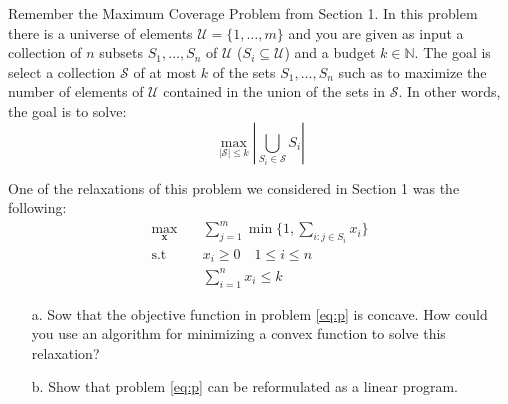 \documentclass[11pt]{article}
\theoremstyle{remark}
\newcommand{\N}{\mathbb{N}}                     %
\newcommand{\bx}{\mathbf{x}}
\begin{document}
Remember the Maximum Coverage Problem from Section 1. In this problem there is
a universe of elements $\mathcal{U} = \{1,\dots,m\}$ and you are given as input
a collection of $n$ subsets $S_1,\dots, S_n$ of $\mathcal{U}$ ($S_i\subseteq
\mathcal{U}$) and a budget $k\in\N$. The goal is select a collection
$\mathcal{S}$ of at most $k$ of the sets $S_1,\dots,S_n$ such as to maximize
the number of elements of $\mathcal{U}$ contained in the union of the sets in
$\mathcal{S}$. In other words, the goal is to solve:
\begin{displaymath}
    \max_{|\mathcal{S}|\leq k}\left|\bigcup_{S_i\in\mathcal{S}} S_i\right|
\end{displaymath}

One of the relaxations of this problem we considered in Section 1 was the
following:
    \begin{equation}
        \tag{P}
        \label{eq:p}
        \begin{aligned}
            \max_{\bx} &\quad \sum_{j=1}^m \min\Bigg\{1,\sum_{i:j\in S_i} x_i\Bigg\}\\
            \text{s.t} &\quad x_i\geq 0\quad 1\leq i\leq n\\
                       &\quad \sum_{i=1}^n x_i\leq k
        \end{aligned}
    \end{equation}

\begin{itemize}
    \item[a.]  Sow that the objective function in problem \eqref{eq:p} is
        concave. How could you use an algorithm for minimizing a convex
        function to solve this relaxation?
    \item[b.] Show that problem \eqref{eq:p} can be reformulated as a linear
        program.
\end{itemize}
\end{document}

